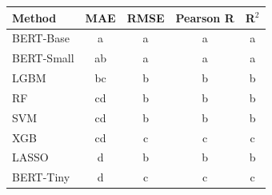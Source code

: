 \begin{tabular}{lcccc}
\toprule
Method & MAE & RMSE & Pearson R & R$^2$ \\
\midrule
BERT-Base & a & a & a & a \\
BERT-Small & ab & a & a & a \\
LGBM & bc & b & b & b \\
RF & cd & b & b & b \\
SVM & cd & b & b & b \\
XGB & cd & c & c & c \\
LASSO & d & b & b & b \\
BERT-Tiny & d & c & c & c \\
\bottomrule
\end{tabular}
